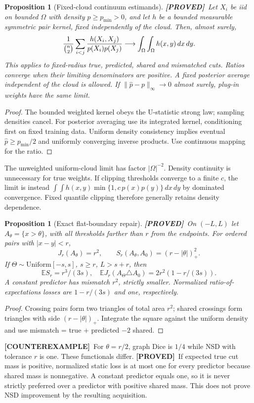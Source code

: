 \documentclass[11pt]{article}
\newtheorem{proposition}[theorem]{Proposition}
\theoremstyle{definition}
\newcommand{\E}{\mathbb E}
\newcommand{\1}{\mathbf 1}
\newcommand{\pr}{\textbf{[PROVED]}}
\newcommand{\ce}{\textbf{[COUNTEREXAMPLE]}}
\begin{document}
\normalsize

\begin{proposition}[Fixed-cloud continuum estimands]\label{prop:Ustat}
\pr\ Let $X_i$ be iid on bounded $\Omega$ with density $p\ge p_{\min}>0$,
and let $h$ be a bounded measurable symmetric pair kernel, fixed independently
of the cloud. Then, almost surely,
\[
 {1\over {n\choose2}}\sum_{i<j}\frac{h(X_i,X_j)}{p(X_i)p(X_j)}
 \longrightarrow\int_\Omega\int_\Omega h(x,y)\,dx\,dy.
\]
This applies to fixed-radius true, predicted, shared and mismatched cuts.
Ratios converge when their limiting denominators are positive.
A fixed posterior average independent of the cloud is allowed.
If $\|\widehat p-p\|_\infty\to0$ almost surely, plug-in weights have the
same limit.
\end{proposition}
\begin{proof}
The bounded weighted kernel obeys the U-statistic strong law; sampling
densities cancel. For posterior averaging use its integrated kernel,
conditioning first on fixed training data. Uniform density consistency
implies eventual $\widehat p\ge p_{\min}/2$ and uniformly converging inverse
products. Use continuous mapping for the ratio.
\end{proof}
The unweighted uniform-cloud limit has factor $|\Omega|^{-2}$.
Density continuity is unnecessary for true weights.
If clipping thresholds converge to a finite $c$, the limit is instead
$\int\!\int h(x,y)\min\{1,c\,p(x)p(y)\}\,dx\,dy$ by dominated convergence.
Fixed quantile clipping therefore generally retains density dependence.

\begin{proposition}[Exact flat-boundary repair]\label{prop:flat}
\pr\ On $(-L,L)$ let $A_\theta=\{x>\theta\}$, with all thresholds farther
than $r$ from the endpoints. For ordered pairs with $|x-y|<r$,
\[
 J_r(A_\theta)=r^2,\qquad
 S_r(A_\theta,A_0)=(r-|\theta|)_+^2.
\]
If $\Theta\sim\mathrm{Uniform}[-s,s]$, $s\ge r$, $L>s+r$, then
\[
 \E S_r=r^3/(3s),\quad
 \E J_r(A_\Theta\triangle A_0)=2r^2(1-r/(3s)).
\]
A constant predictor has mismatch $r^2$, strictly smaller.
Normalized ratio-of-expectations losses are $1-r/(3s)$ and one, respectively.
\end{proposition}
\begin{proof}
Crossing pairs form two triangles of total area $r^2$; shared crossings
form triangles with side $(r-|\theta|)_+$. Integrate the square against
the uniform density and use mismatch = true + predicted $-2$ shared.
\end{proof}
\ce\ For $\theta=r/2$, graph Dice is $1/4$ while NSD with tolerance $r$
is one. These functionals differ.
\pr\ If expected true cut mass is positive, normalized static loss is
at most one for every predictor because shared mass is nonnegative.
A constant predictor equals one, so it is never strictly preferred over
a predictor with positive shared mass. This does not prove NSD improvement
by the resulting acquisition.
\end{document}
